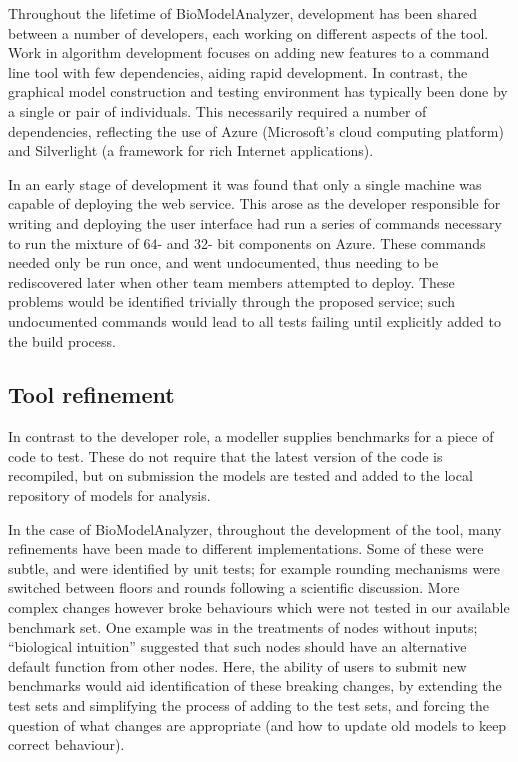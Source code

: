 \documentclass[conference]{IEEEtran}
\begin{document}
Throughout the lifetime of BioModelAnalyzer, development has been
shared between a number of developers, each working on different
aspects of the tool. Work in algorithm development focuses on adding
new features to a command line tool with few dependencies, aiding
rapid development. In contrast, the graphical model construction and
testing environment has typically been done by a single or pair of
individuals.  This necessarily required a number of dependencies,
reflecting the use of Azure (Microsoft's cloud computing platform) and
Silverlight (a framework for rich Internet applications).

In an early stage of development it was found that only a single
machine was capable of deploying the web service. This arose as the
developer responsible for writing and deploying the user interface had
run a series of commands necessary to run the mixture of 64- and 32-
bit components on Azure. These commands needed only be run once, and
went undocumented, thus needing to be rediscovered later when other
team members attempted to deploy.  These problems would be identified
trivially through the proposed service; such undocumented commands
would lead to all tests failing until explicitly added to the build
process.

\subsection{Tool refinement}

In contrast to the developer role, a modeller supplies benchmarks for
a piece of code to test. These do not require that the latest version
of the code is recompiled, but on submission the models are tested and
added to the local repository of models for analysis.

In the case of BioModelAnalyzer, throughout the development of the
tool, many refinements have been made to different
implementations. Some of these were subtle, and were identified by
unit tests; for example rounding mechanisms were switched between
floors and rounds following a scientific discussion. More complex
changes however broke behaviours which were not tested in our
available benchmark set. One example was in the treatments of nodes
without inputs; ``biological intuition'' suggested that such nodes
should have an alternative default function from other nodes. Here,
the ability of users to submit new benchmarks would aid identification
of these breaking changes, by extending the test sets and simplifying
the process of adding to the test sets, and forcing the question of
what changes are appropriate (and how to update old models to keep
correct behaviour).
\end{document}
